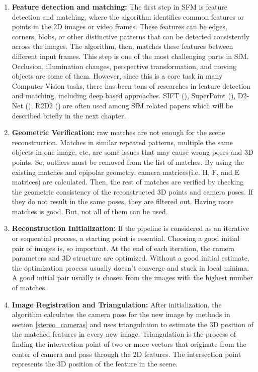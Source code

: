 \documentclass[11pt]{article}
\begin{document}
    \begin{enumerate}
        \item \textbf{Feature detection and matching:} The first step in SFM is feature detection and matching, where
        the algorithm identifies common features or points in the 2D images or video frames. These features
        can be edges, corners, blobs, or other distinctive patterns that can be detected consistently across
        the images. The algorithm, then, matches these features between different input frames. This step is one
        of the most challenging parts in SfM. Occlusion, illumination changes, perspective transformation, and moving objects
        are some of them. However, since this is a core task in many Computer Vision tasks, there has been
        tons of researches in feature detection and matching, including deep based approaches. SIFT (\cite{lowe1999object}), SuperPoint (\cite{detone2018superpoint}),
        D2-Net (\cite{dusmanu2019d2net}), R2D2 (\cite{revaud2019r2d2}) are often used among SfM related papers which
        will be described briefly in the next chapter.

        \item \textbf{Geometric Verification:} raw matches are not enough for the scene reconstruction.
        Matches in similar repeated patterns, multiple the same objects in one image, etc, are some issues that may cause wrong
        poses and 3D points. So, outliers must be removed from the list of matches. By using the existing matches and
        epipolar geometry, camera matrices(i.e. H, F, and E matrices) are calculated.
        Then, the rest of matches are verified by checking the geometric consistency of the reconstructed 3D points and
        camera poses. If they do not result in the same poses, they are filtered out. Having more matches is good.
        But, not all of them can be used.

        \item \textbf{Reconstruction Initialization:} If the pipeline is considered as an iterative or sequential process,
        a starting point is essential. Choosing a good initial pair of images is, so important. At the end of
        each iteration, the camera parameters and 3D structure are optimized. Without a good initial estimate,
        the optimization process usually doesn't converge and stuck in local minima. A good initial pair usually is
        chosen from the images with the highest number of matches.

        \item \textbf{Image Registration and Triangulation:} After initialization, the algorithm calculates the
        camera pose for the new image by methods in section \ref{stereo_cameras} and uses triangulation to estimate
        the 3D position of the matched features in every new image. Triangulation is the process of finding the intersection point
        of two or more vectors that originate from the center of camera and pass through the 2D features. The intersection
        point represents the 3D position of the feature in the scene.


\end{enumerate}
\end{document}

